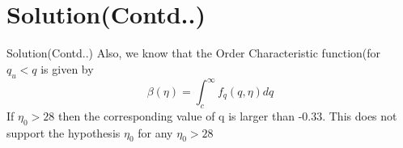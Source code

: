 \documentclass{beamer}
\begin{document}
\section{Solution(Contd..)}
\begin{frame}{Solution(Contd..)}
Also, we know that the Order Characteristic function(for $q_{u}<q$  is given by
\begin{equation}
    \beta(\eta)= \int_{c}^{\infty} f_{q}(q, \eta)dq
\end{equation}
If $\eta_{0}>28$ then the corresponding value of q is larger than -0.33. This does not support the hypothesis $\eta_{0}$ for any $\eta_{0}>28$

\end{frame}
\end{document}
